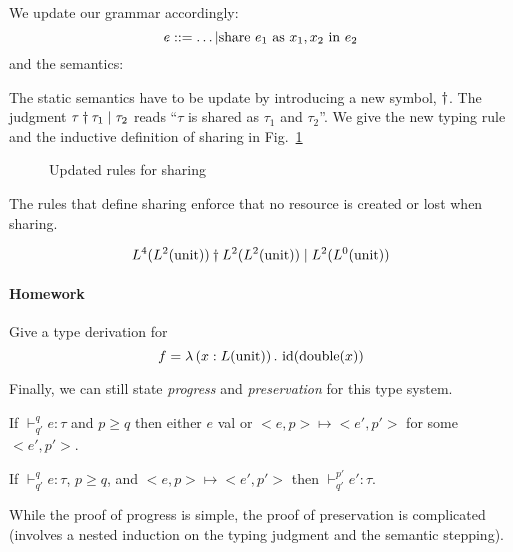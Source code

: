 \documentclass[ manuscript,screen, nonacm]{acmart}
\begin{document}
We update our grammar accordingly:
\[
e ::= \dots | \mathrm{share}~e_1~\mathrm{as}~x_1,x_2~\mathrm{in}~e_2
\]
and the semantics:

The static semantics have to be update by introducing a new symbol, \(\dagger\).
The judgment \(\tau\dagger\tau_1\mid\tau_2\) reads ``\(\tau\) is shared as \(\tau_1\) and
\(\tau_2\)''.
We give the new typing rule and the inductive definition of sharing in
Fig.~\ref{fig:sharing}

\begin{figure}
    \caption{Updated rules for sharing}
    \label{fig:sharing}
\end{figure}

The rules that define sharing enforce that no resource is created or lost when sharing.
\begin{example}
  \[
  L^4(L^2(\mathrm{unit}))\dagger L^2(L^2(\mathrm{unit}))\mid L^2(L^0(\mathrm{unit}))
  \]
\end{example}

\paragraph{Homework} Give a type derivation for
\[
  f = \lambda\left(x:L(\mathrm{unit})\right).~\mathrm{id}(\mathrm{double}(x))
\]

Finally, we can still state \emph{progress} and \emph{preservation} for this type system.
\begin{theorem}[Progress]If $\vdash^q_{q'} e:\tau$ and $p\geq q$ then either $e$ val or $<e, p> \mapsto <e', p'>$ for some $<e', p'>$.
\end{theorem}

\begin{theorem}[Preservation] 
If $\vdash^q_{q'} e:\tau$, $p \geq q$, and $<e,p>\mapsto <e', p'>$ then $\vdash^{p'}_{q'} e':\tau$.
\end{theorem}

While the proof of progress is simple, the proof of preservation is complicated (involves a nested induction on the typing judgment and the semantic stepping).
\end{document}
